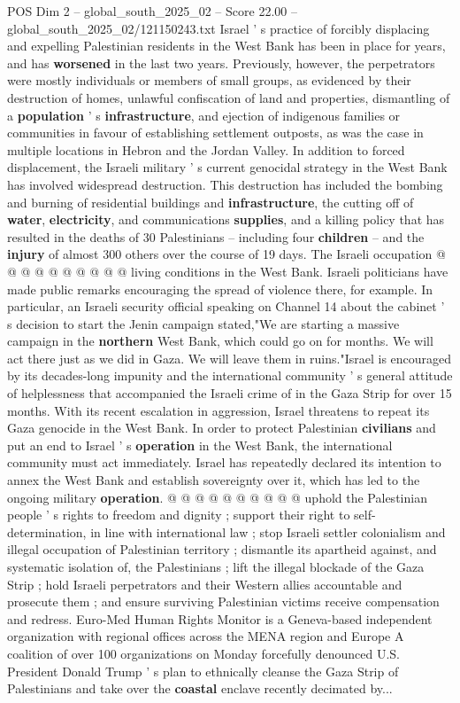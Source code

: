 \begin{textsample}{POS Dim 2 – global\_south\_2025\_02 – Score 22.00 – global\_south\_2025\_02/121150243.txt}
Israel ' s practice of forcibly displacing and expelling Palestinian residents in the West Bank has been in place for years, and has \textbf{worsened} in the last two years.
Previously, however, the perpetrators were mostly individuals or members of small groups, as evidenced by their destruction of homes, unlawful confiscation of land and properties, dismantling of a \textbf{population} ' s \textbf{infrastructure}, and ejection of indigenous families or communities in favour of establishing settlement outposts, as was the case in multiple locations in Hebron and the Jordan Valley.
In addition to forced displacement, the Israeli military ' s current genocidal strategy in the West Bank has involved widespread destruction.
This destruction has included the bombing and burning of residential buildings and \textbf{infrastructure}, the cutting off of \textbf{water}, \textbf{electricity}, and communications \textbf{supplies}, and a killing policy that has resulted in the deaths of 30 Palestinians -- including four \textbf{children} -- and the \textbf{injury} of almost 300 others over the course of 19 days.
The Israeli occupation @ @ @ @ @ @ @ @ @ @ living conditions in the West Bank.
Israeli politicians have made public remarks encouraging the spread of violence there, for example.
In particular, an Israeli security official speaking on Channel 14 about the cabinet ' s decision to start the Jenin campaign stated,"We are starting a massive campaign in the \textbf{northern} West Bank, which could go on for months.
We will act there just as we did in Gaza.
We will leave them in ruins."Israel is encouraged by its decades-long impunity and the international community ' s general attitude of helplessness that accompanied the Israeli crime of in the Gaza Strip for over 15 months.
With its recent escalation in aggression, Israel threatens to repeat its Gaza genocide in the West Bank.
In order to protect Palestinian \textbf{civilians} and put an end to Israel ' s \textbf{operation} in the West Bank, the international community must act immediately.
Israel has repeatedly declared its intention to annex the West Bank and establish sovereignty over it, which has led to the ongoing military \textbf{operation}. @ @ @ @ @ @ @ @ @ @ uphold the Palestinian people ' s rights to freedom and dignity ; support their right to self-determination, in line with international law ; stop Israeli settler colonialism and illegal occupation of Palestinian territory ; dismantle its apartheid against, and systematic isolation of, the Palestinians ; lift the illegal blockade of the Gaza Strip ; hold Israeli perpetrators and their Western allies accountable and prosecute them ; and ensure surviving Palestinian victims receive compensation and redress.
Euro-Med Human Rights Monitor is a Geneva-based independent organization with regional offices across the MENA region and Europe A coalition of over 100 organizations on Monday forcefully denounced U.S.
President Donald Trump ' s plan to ethnically cleanse the Gaza Strip of Palestinians and take over the \textbf{coastal} enclave recently decimated by...


\end{textsample}
